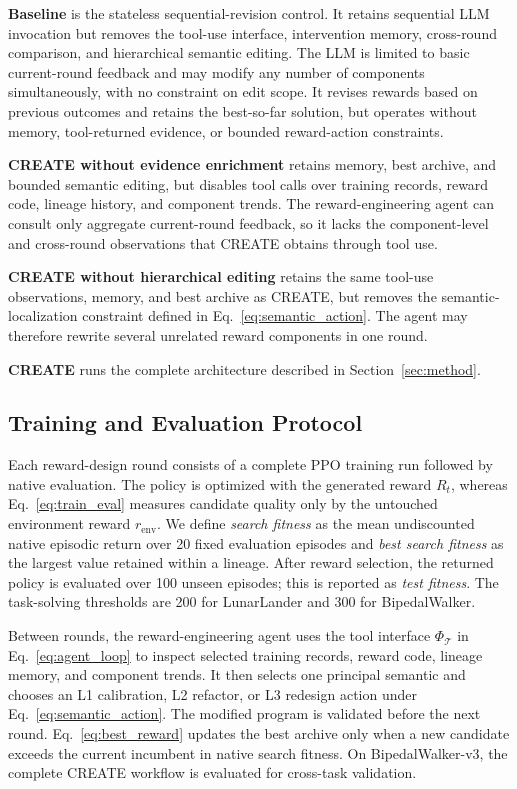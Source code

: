 \textbf{Baseline} is the stateless sequential-revision control. It retains sequential LLM invocation but removes the tool-use interface, intervention memory, cross-round comparison, and hierarchical semantic editing. The LLM is limited to basic current-round feedback and may modify any number of components simultaneously, with no constraint on edit scope. It revises rewards based on previous outcomes and retains the best-so-far solution, but operates without memory, tool-returned evidence, or bounded reward-action constraints.

\textbf{CREATE without evidence enrichment} retains memory, best archive, and bounded semantic editing, but disables tool calls over training records, reward code, lineage history, and component trends. The reward-engineering agent can consult only aggregate current-round feedback, so it lacks the component-level and cross-round observations that CREATE obtains through tool use.

\textbf{CREATE without hierarchical editing} retains the same tool-use observations, memory, and best archive as CREATE, but removes the semantic-localization constraint defined in Eq.~\ref{eq:semantic_action}. The agent may therefore rewrite several unrelated reward components in one round.

\textbf{CREATE} runs the complete architecture described in Section~\ref{sec:method}.

\subsection{Training and Evaluation Protocol}
\label{sec:training_protocol}

Each reward-design round consists of a complete PPO training run followed by native evaluation. The policy is optimized with the generated reward $R_t$, whereas Eq.~\ref{eq:train_eval} measures candidate quality only by the untouched environment reward $r_{\mathrm{env}}$. We define \emph{search fitness} as the mean undiscounted native episodic return over 20 fixed evaluation episodes and \emph{best search fitness} as the largest value retained within a lineage. After reward selection, the returned policy is evaluated over 100 unseen episodes; this is reported as \emph{test fitness}. The task-solving thresholds are 200 for LunarLander and 300 for BipedalWalker.

Between rounds, the reward-engineering agent uses the tool interface $\Phi_{\mathcal T}$ in Eq.~\ref{eq:agent_loop} to inspect selected training records, reward code, lineage memory, and component trends. It then selects one principal semantic and chooses an L1 calibration, L2 refactor, or L3 redesign action under Eq.~\ref{eq:semantic_action}. The modified program is validated before the next round. Eq.~\ref{eq:best_reward} updates the best archive only when a new candidate exceeds the current incumbent in native search fitness. On BipedalWalker-v3, the complete CREATE workflow is evaluated for cross-task validation.
